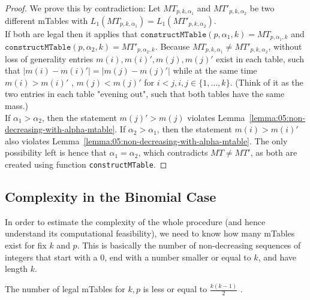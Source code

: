 \begin{proof}
	\label{proof:05:mtable-mass-injection}
	We prove this by contradiction: Let $MT_{p,k,\alpha_1}$ and $MT'_{p,k, \alpha_2}$ be two different mTables with $L_1(MT_{p,k,\alpha_1 }) = L_1(MT'_{p,k,\alpha_2})$.\\
	If both are legal then it applies that $\texttt{constructMTable}(p,\alpha_1 ,k)=MT_{p,\alpha_1 ,k}$
	and \\ $\texttt{constructMTable}(p,\alpha_2 ,k)=MT'_{p,\alpha_2 ,k}$.
	Because $MT_{p,k,\alpha_1} \neq MT'_{p,k,\alpha_2}$, without loss of generality entries $m(i), m(i)' , m(j) , m(j)'$ exist in each table, such that $|m(i) - m(i)'| = |m(j) - m(j)'|$ while at the same time $m(i) > m(i)'$ , $m(j) < m(j)'$ for $i<j, i,j \in \lbrace 1, \ldots , k \rbrace$.
	(Think of it as the two entries in each table "evening out", such that both tables have the same mass.)\\
	If $\alpha_1 > \alpha_2$, then the statement $m(j)' > m(j)$ violates Lemma~\ref{lemma:05:non-decreasing-with-alpha-mtable}.
	If $\alpha_2 > \alpha_1$, then the statement $m(i) > m(i)'$ also violates Lemma~\ref{lemma:05:non-decreasing-with-alpha-mtable}.
	The only possibility left is hence that $\alpha_1 = \alpha_2$, which contradicts $MT \neq MT'$, as both are created using function \texttt{constructMTable}.
\end{proof}

\subsection{Complexity in the Binomial Case} In order to estimate the complexity of the whole procedure (and hence understand its computational feasibility), we need to know how many mTables exist for fix $k$ and $p$.
%
This is basically the number of non-decreasing sequences of integers that start with a $0$, end with a number smaller or equal to $k$, and have length $k$.
%
\begin{theorem}
	\label{theorem:05:number-of-mtables}
	The number of legal mTables for $k,p$ is less or equal to $\frac{k(k-1)}{2}$ .
\end{theorem}

